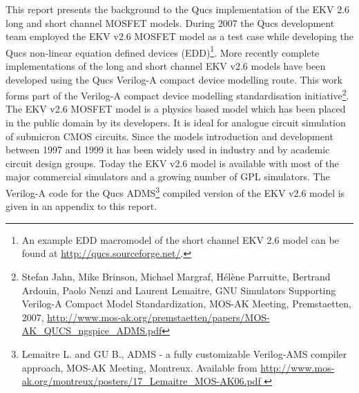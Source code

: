 %
%
%
%

\renewcommand{\thesubfigure}{\thefigure(\alph{subfigure})}
\makeatletter
  \renewcommand{\@thesubfigure}{\thesubfigure:\space}
  \renewcommand{\p@subfigure}{}
\makeatother

\renewcommand{\thesubtable}{\thetable(\alph{subtable})}
\makeatletter
  \renewcommand{\@thesubtable}{\thesubtable:\space}
  \renewcommand{\p@subtable}{}
\makeatother


This report presents the background to the Qucs implementation of the
EKV 2.6 long and short channel MOSFET models. During 2007 the Qucs
development team employed the EKV v2.6 MOSFET model as a test case
while developing the Qucs non-linear equation defined devices
(EDD)\footnote{An example EDD macromodel of the short channel EKV 2.6
model can be found at \url{ http://qucs.sourceforge.net/}.}. More
recently complete implementations of the long and short channel EKV
v2.6 models have been developed using the Qucs Verilog-A compact
device modelling route.  This work forms part of the Verilog-A compact
device modelling standardisation initiative\footnote{Stefan Jahn, Mike
Brinson, Michael Margraf, H\'{e}l\`{e}ne Parruitte, Bertrand Ardouin,
Paolo Nenzi and Laurent Lemaitre, GNU Simulators Supporting Verilog-A
Compact Model Standardization, MOS-AK Meeting, Premstaetten, 2007,
\url{http://www.mos-ak.org/premstaetten/papers/MOS-AK_QUCS_ngspice_ADMS.pdf}
}.  The EKV v2.6 MOSFET model is a physics based model which has been
placed in the public domain by its developers. It is ideal for
analogue circuit simulation of submicron CMOS circuits.  Since the
models introduction and development between 1997 and 1999 it has been
widely used in industry and by academic circuit design groups. Today
the EKV v2.6 model is available with most of the major commercial
simulators and a growing number of GPL simulators. The Verilog-A code
for the Qucs ADMS\footnote{Lemaitre L.  and GU B., ADMS - a fully
customizable Verilog-AMS compiler approach, MOS-AK Meeting,
Montreux. Available from
\url{http://www.mos-ak.org/montreux/posters/17_Lemaitre_MOS-AK06.pdf }
} compiled version of the EKV v2.6 model is given in an appendix to
this report.



